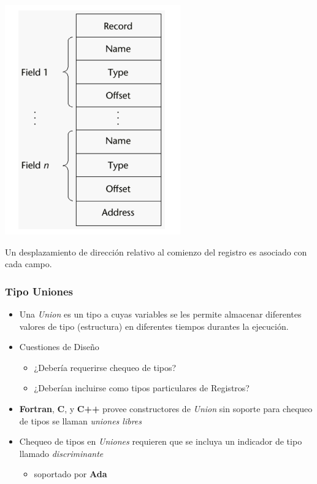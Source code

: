 \documentclass[11pt]{article}
\begin{document}
\includegraphics[width=.9\linewidth]{implementregistros.png}

Un desplazamiento de dirección relativo al comienzo del registro es
asociado con cada campo.

\subsubsection*{Tipo Uniones}
\label{sec:orgheadline37}
\begin{itemize}
\item Una \emph{Union} es un tipo a cuyas variables se les permite
almacenar diferentes valores de tipo (estructura) en diferentes tiempos durantes
la ejecución.
\item Cuestiones de Diseño
\begin{itemize}
\item ¿Debería requerirse chequeo de tipos?
\item ¿Deberían incluirse como tipos particulares de Registros?
\end{itemize}
\item \textbf{Fortran}, \textbf{C}, y \textbf{C++} provee constructores de \emph{Union} sin soporte
para chequeo de tipos se llaman \emph{uniones libres}
\item Chequeo de tipos en \emph{Uniones} requieren que se incluya un indicador
de tipo llamado \emph{discriminante}
\begin{itemize}
\item soportado por \textbf{Ada}
\end{itemize}
\end{itemize}
\end{document}
